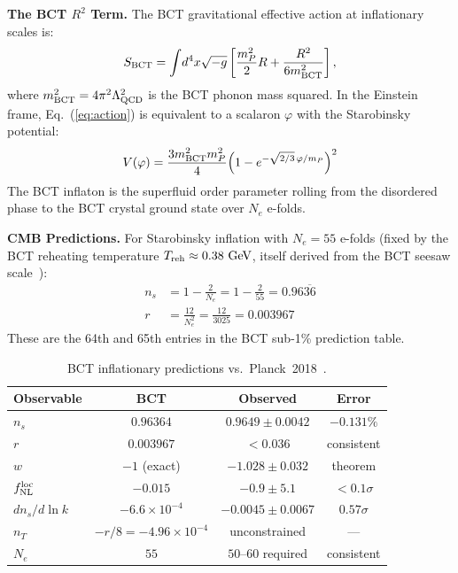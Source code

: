 \documentclass[aps,prl,twocolumn,superscriptaddress,floatfix]{revtex4-2}
\begin{document}
\medskip
\noindent\textbf{The BCT $R^2$ Term.}
The BCT gravitational effective action at inflationary scales is:
\begin{equation}
  S_{\rm BCT} = \int\!d^4x\sqrt{-g}\left[\frac{m_P^2}{2}R
    + \frac{R^2}{6m_{\rm BCT}^2}\right],
  \label{eq:action}
\end{equation}
where $m_{\rm BCT}^2 = 4\pi^2\Lambda_{\rm QCD}^2$ is the BCT phonon mass
squared. In the Einstein frame, Eq.~(\ref{eq:action}) is equivalent to
a scalaron $\varphi$ with the Starobinsky potential:
\begin{equation}
  V(\varphi) = \frac{3m_{\rm BCT}^2 m_P^2}{4}
    \!\left(1 - e^{-\sqrt{2/3}\,\varphi/m_P}\right)^2
  \label{eq:Vphi}
\end{equation}
The BCT inflaton is the superfluid order parameter rolling from the
disordered phase to the BCT crystal ground state over $N_e$ e-folds.

\medskip
\noindent\textbf{CMB Predictions.}
For Starobinsky inflation with $N_e = 55$ e-folds (fixed by the BCT
reheating temperature $T_{\rm reh} \approx 0.38\ \mathrm{GeV}$,
itself derived from the BCT seesaw scale~\cite{Monograph}):
\begin{align}
  n_s &= 1 - \frac{2}{N_e} = 1 - \frac{2}{55} = 0.96\overline{36} \label{eq:ns} \\
  r   &= \frac{12}{N_e^2} = \frac{12}{3025} = 0.003967 \label{eq:r}
\end{align}
These are the 64th and 65th entries in the BCT sub-1\% prediction table.

\begin{table}[h]
\centering
\caption{BCT inflationary predictions vs.\ Planck~2018~\cite{Planck2018}.}
\label{tab:CMB}
\begin{tabular}{lccc}
\toprule
Observable & BCT & Observed & Error \\
\midrule
$n_s$ & $0.96364$ & $0.9649\pm0.0042$ & $-0.131\%$ \\
$r$ & $0.003967$ & ${<}0.036$ & consistent \\
$w$ & $-1$ (exact) & $-1.028\pm0.032$ & theorem \\
$f_{\rm NL}^{\rm loc}$ & $-0.015$ & $-0.9\pm5.1$ & ${<}0.1\sigma$ \\
$dn_s/d\ln k$ & $-6.6\times10^{-4}$ & $-0.0045\pm0.0067$ & $0.57\sigma$ \\
$n_T$ & $-r/8{=}{-}4.96\!\times\!10^{-4}$ & unconstrained & — \\
$N_e$ & $55$ & $50$--$60$ required & consistent \\
\bottomrule
\end{tabular}
\end{table}
\end{document}
